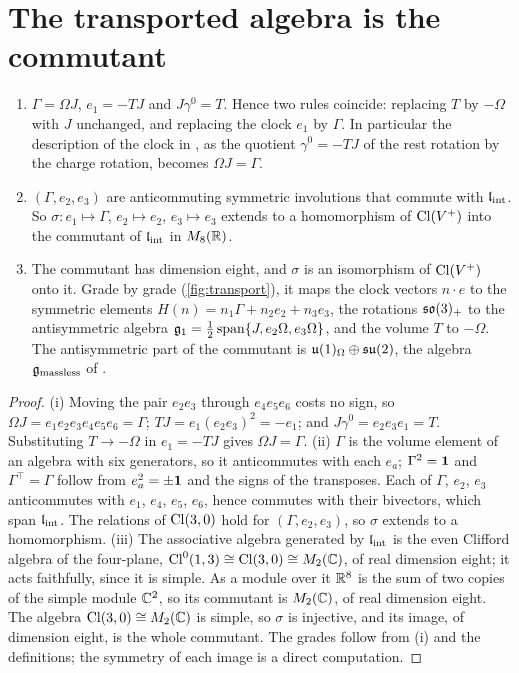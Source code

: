 \section{The transported algebra is the commutant}

\begin{theorem}
\label{thm:clifford1}
\begin{enumerate}[label=(\roman*),leftmargin=2.2em,itemsep=1pt]
\item $\Gamma=\Omega J$, $e_1=-TJ$ and $J\gamma^0=T$. Hence two rules coincide: replacing $T$ by $-\Omega$ with $J$ unchanged, and
replacing the clock $e_1$ by $\Gamma$. In particular the description of the clock in , as the quotient $\gamma^0=-TJ$ of
the rest rotation by the charge rotation, becomes $\Omega J=\Gamma$.
\item $(\Gamma,e_2,e_3)$ are anticommuting symmetric involutions that commute with $\mathfrak l_{\rm int}$. So $\sigma:e_1\mapsto\Gamma$, $e_2\mapsto e_2$,
$e_3\mapsto e_3$ extends to a homomorphism of $\mathrm{Cl}(V^+)$ into the commutant of $\mathfrak l_{\rm int}$ in $M_8(\mathbb{R})$.
\item The commutant has dimension eight, and $\sigma$ is an isomorphism of $\mathrm{Cl}(V^+)$ onto it. Grade by grade (\cref{fig:transport}), it
maps the clock vectors $n\cdot e$ to the symmetric elements $H(n)=n_1\Gamma+n_2e_2+n_3e_3$, the rotations $\mathfrak{so}(3)_+$ to the antisymmetric
algebra $\mathfrak g_1=\tfrac12\,\mathrm{span}\{J,e_2\Omega,e_3\Omega\}$, and the volume $T$ to $-\Omega$. The antisymmetric part of the
commutant is $\mathfrak{u}(1)_\Omega\oplus\mathfrak{su}(2)$, the algebra $\mathfrak g_{\rm massless}$ of .
\end{enumerate}
\end{theorem}

\begin{proof}
(i) Moving the pair $e_2e_3$ through $e_4e_5e_6$ costs no sign, so $\Omega J=e_1e_2e_3e_4e_5e_6=\Gamma$; $TJ=e_1(e_2e_3)^2=-e_1$; and
$J\gamma^0=e_2e_3e_1=T$. Substituting $T\to-\Omega$ in $e_1=-TJ$ gives $\Omega J=\Gamma$.
(ii) $\Gamma$ is the volume element of an algebra with six generators, so it anticommutes with each $e_a$; $\Gamma^2=\mathbf 1$ and
$\Gamma^\top=\Gamma$ follow from $e_a^2=\pm\mathbf 1$ and the signs of the transposes. Each of $\Gamma$, $e_2$, $e_3$ anticommutes with $e_1$,
$e_4$, $e_5$, $e_6$, hence commutes with their bivectors, which span $\mathfrak l_{\rm int}$. The relations of $\mathrm{Cl}(3,0)$ hold for $(\Gamma,e_2,e_3)$, so
$\sigma$ extends to a homomorphism.
(iii) The associative algebra generated by $\mathfrak l_{\rm int}$ is the even Clifford algebra of the four-plane, $\mathrm{Cl}^0(1,3)\cong\mathrm{Cl}(3,0)\cong M_2(\mathbb{C})$, of
real dimension eight; it acts faithfully, since it is simple. As a module over it $\mathbb{R}^8$ is the sum of two copies of the simple module
$\mathbb{C}^2$, so its commutant is $M_2(\mathbb{C})$, of real dimension eight. The algebra $\mathrm{Cl}(3,0)\cong M_2(\mathbb{C})$ is simple, so $\sigma$ is injective, and
its image, of dimension eight, is the whole commutant. The grades follow from (i) and the definitions; the symmetry of each image is a
direct computation.
\end{proof}


